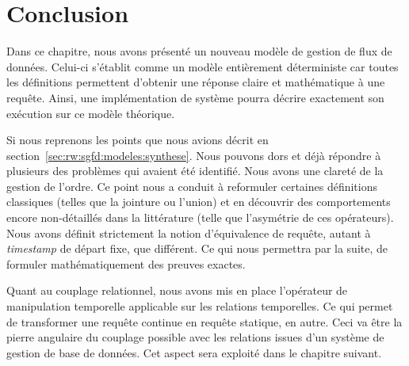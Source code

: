 \section{Conclusion}\label{sec:contrib:astral:conclusion}
Dans ce chapitre, nous avons présenté un nouveau modèle de gestion de flux de données. Celui-ci s'établit comme un modèle entièrement déterministe car toutes les définitions permettent d'obtenir une réponse claire et mathématique à une requête. Ainsi, une implémentation de système pourra décrire exactement son exécution sur ce modèle théorique.

Si nous reprenons les points que nous avions décrit en section~\ref{sec:rw:sgfd:modeles:synthese}. Nous pouvons dors et déjà répondre à plusieurs des problèmes qui avaient été identifié. Nous avons une clareté de la gestion de l'ordre. Ce point nous a conduit à reformuler certaines définitions classiques (telles que la jointure ou l'union) et en découvrir des comportements encore non-détaillés dans la littérature (telle que l'asymétrie de ces opérateurs). Nous avons définit strictement la notion d'équivalence de requête, autant à \textit{timestamp} de départ fixe, que différent. Ce qui nous permettra par la suite, de formuler mathématiquement des preuves exactes.

Quant au couplage relationnel, nous avons mis en place l'opérateur de manipulation temporelle applicable sur les relations temporelles. Ce qui permet de transformer une requête continue en requête statique, en autre. Ceci va être la pierre angulaire du couplage possible avec les relations issues d'un système de gestion de base de données. Cet aspect sera exploité dans le chapitre suivant.
